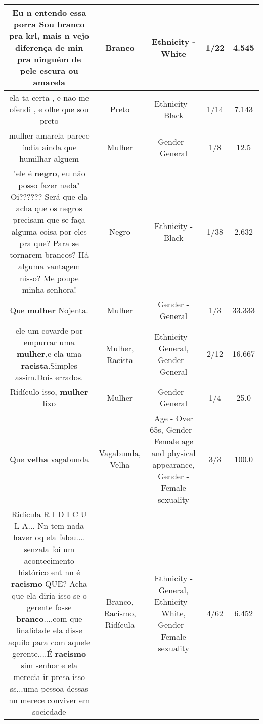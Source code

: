 \documentclass[11pt]{article}
\newlength\mylength
\begin{document}
\begin{center}
\begin{longtable}{|C{.65\mylength}|C{.30\mylength}|C{.12\mylength}|C{.12\mylength}|C{.12\mylength}|}
  \small Eu n entendo essa porra Sou \textbf{branco} pra krl, mais n vejo diferença de min pra ninguém de pele escura ou amarela\normalsize   & Branco & Ethnicity - White & 1/22 & 4.545 \\  \hline
  \small ela ta certa , e nao me ofendi , e olhe que sou preto\normalsize   & Preto & Ethnicity - Black & 1/14 & 7.143 \\  \hline
  \small mulher amarela parece índia ainda que humilhar alguem\normalsize   & Mulher & Gender - General & 1/8 & 12.5 \\  \hline
  \small "ele é \textbf{negro}, eu não posso fazer nada" Oi?????? Será que ela acha que os negros precisam que se faça alguma coisa por eles pra que? Para se tornarem brancos? Há alguma vantagem nisso? Me poupe minha senhora!\normalsize   & Negro & Ethnicity - Black & 1/38 & 2.632 \\  \hline
  \small Que \textbf{mulher} Nojenta.\normalsize   & Mulher & Gender - General & 1/3 & 33.333 \\  \hline
  \small ele um covarde por empurrar uma \textbf{mulher},e ela uma \textbf{racista}.Simples assim.Dois errados.\normalsize   & Mulher, Racista & Ethnicity - General, Gender - General & 2/12 & 16.667 \\  \hline
  \small Ridículo isso, \textbf{mulher} lixo\normalsize   & Mulher & Gender - General & 1/4 & 25.0 \\  \hline
  \small Que \textbf{v\textbf{elha}} vagabunda\normalsize   & Vagabunda, Velha & Age - Over 65s, Gender - Female age and physical appearance, Gender - Female sexuality & 3/3 & 100.0 \\  \hline
  \small Ridícula R I D I C U L A... Nn tem nada haver oq ela falou....  senzala foi um acontecimento histórico ent nn é \textbf{racismo} QUE? Acha que ela diria isso se o gerente fosse \textbf{branco}....com que finalidade ela disse aquilo para com aquele gerente....É \textbf{racismo} sim senhor e ela merecia ir presa isso ss...uma pessoa dessas nn merece conviver em sociedade\normalsize   & Branco, Racismo, Ridícula & Ethnicity - General, Ethnicity - White, Gender - Female sexuality & 4/62 & 6.452 \\  \hline

\end{longtable}
\end{center}
\end{document}
